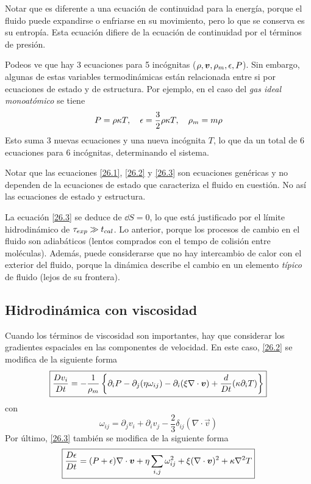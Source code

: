 Notar que es diferente a una ecuación de continuidad para la energía, porque el fluido puede expandirse o enfriarse en su movimiento, pero lo que se conserva es su entropía. Esta ecuación difiere de la ecuación de continuidad por el términos de presión.

Podeos ve que hay 3 ecuaciones para 5 incógnitas ($\rho,\vb*{v},\rho_m,\epsilon,P$). Sin embargo, algunas de estas variables termodinámicas están relacionada entre si por ecuaciones de estado y de estructura. Por ejemplo, en el caso del \textit{gas ideal monoatómico} se tiene
\begin{equation}
  P=\rho\kappa T,\quad \epsilon=\frac{3}{2}\rho\kappa T,\quad \rho_m=m\rho 
\end{equation}
Esto suma 3 nuevas ecuaciones y una nueva incógnita $T$, lo que da un total de 6 ecuaciones para 6 incógnitas, determinando el sistema.

Notar que las ecuaciones \eqref{26.1}, \eqref{26.2} y \eqref{26.3} son ecuaciones genéricas y no dependen de la ecuaciones de estado que caracteriza el fluido en cuestión. No así las ecuaciones de estado y estructura.

La ecuación \eqref{26.3} se deduce de $\dd S=0$, lo que está justificado por el límite hidrodinámico de $\tau_{exp}\gg t_{cal}$. Lo anterior, porque los procesos de cambio en el fluido son adiabáticos (lentos comprados con el tempo de colisión entre moléculas). Además, puede considerarse que no hay intercambio de calor con el exterior del fluido, porque la dinámica describe el cambio en un elemento \textit{típico} de fluido (lejos de su frontera).

\subsection{Hidrodinámica con viscosidad}
Cuando los términos de viscosidad son importantes, hay que considerar los gradientes espaciales en las componentes de velocidad. En este caso, \eqref{26.2} se modifica de la siguiente forma
\begin{equation}\label{26.22}
  \boxed{\frac{D v_i}{Dt}=-\frac{1}{\rho_m}\left\{\partial_iP-\partial_j(\eta\omega_{ij})-\partial_i(\xi \nabla\cdot\vb*{v})+\frac{d}{Dt}(\kappa\partial_i T)\right\}}
\end{equation}
con 
\begin{equation}\label{26.33}
  \omega_{ij}=\partial_jv_i+\partial_iv_j-\frac{2}{3}\delta_{ij}(\nabla\cdot\vec{v})
\end{equation}
Por último, \eqref{26.3} también se modifica de la siguiente forma
\begin{equation}
\boxed{  \frac{D\epsilon }{Dt}=(P+\epsilon)\nabla\cdot\vb*{v}+\eta\sum_{i,j}\omega_{ij}^2+\xi(\nabla\cdot\vb*{v})^2+\kappa\nabla^2T}
\end{equation}

